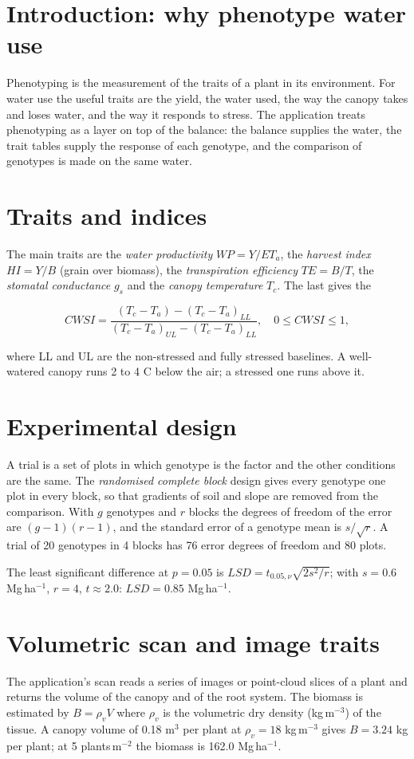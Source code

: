 \section{Introduction: why phenotype water use}
Phenotyping is the measurement of the traits of a plant in its environment. For water use the useful traits are the yield, the water used, the way the canopy takes and loses water, and the way it responds to stress. The application treats phenotyping as a layer on top of the balance: the balance supplies the water, the trait tables supply the response of each genotype, and the comparison of genotypes is made on the same water.

\section{Traits and indices}
The main traits are the \emph{water productivity} $WP=Y/ET_a$, the \emph{harvest index} $HI=Y/B$ (grain over biomass), the \emph{transpiration efficiency} $TE=B/T$, the \emph{stomatal conductance} $g_s$ and the \emph{canopy temperature} $T_c$. The last gives the 

\begin{equation}CWSI=\frac{(T_c-T_a)-(T_c-T_a)_{LL}}{(T_c-T_a)_{UL}-(T_c-T_a)_{LL}},\quad 0\le CWSI\le1,\end{equation}


where LL and UL are the non-stressed and fully stressed baselines. A well-watered canopy runs 2 to 4 C below the air; a stressed one runs above it.

\section{Experimental design}
A trial is a set of plots in which genotype is the factor and the other conditions are the same. The \emph{randomised complete block} design gives every genotype one plot in every block, so that gradients of soil and slope are removed from the comparison. With $g$ genotypes and $r$ blocks the degrees of freedom of the error are $(g-1)(r-1)$, and the standard error of a genotype mean is $s/\sqrt r$. A trial of 20 genotypes in 4 blocks has 76 error degrees of freedom and 80 plots.

The least significant difference at $p=0.05$ is $LSD=t_{0.05,\nu}\sqrt{2s^2/r}$; with $s=0.6$ Mg\,ha$^{-1}$, $r=4$, $t\approx2.0$: $LSD=0.85$ Mg\,ha$^{-1}$.

\section{Volumetric scan and image traits}
The application's scan reads a series of images or point-cloud slices of a plant and returns the volume of the canopy and of the root system. The biomass is estimated by $B=\rho_{v}V$ where $\rho_v$ is the volumetric dry density (kg\,m$^{-3}$) of the tissue. A canopy volume of 0.18 m$^3$ per plant at $\rho_v=18$ kg\,m$^{-3}$ gives $B=3.24$ kg per plant; at 5 plants\,m$^{-2}$ the biomass is 162.0 Mg\,ha$^{-1}$.

